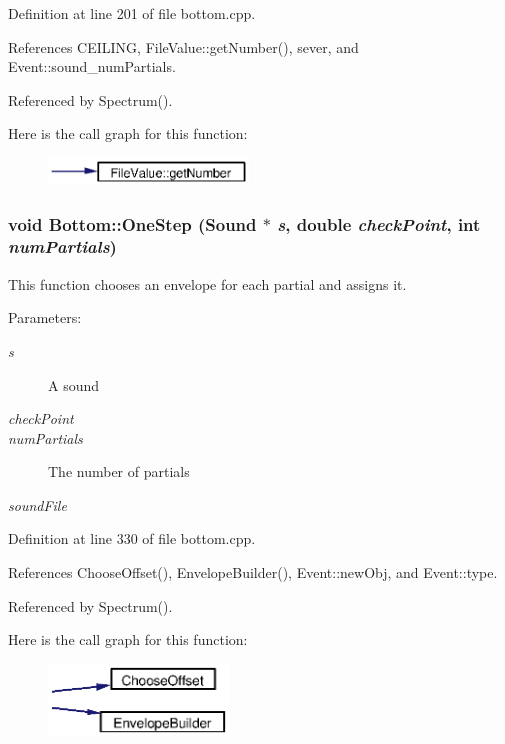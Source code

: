 Definition at line 201 of file bottom.cpp.

References CEILING, File\-Value::get\-Number(), sever, and Event::sound\_\-num\-Partials.

Referenced by Spectrum().

Here is the call graph for this function:\begin{figure}[H]
\begin{center}
\leavevmode
\includegraphics[width=151pt]{classBottom_a15_cgraph}
\end{center}
\end{figure}
\subsubsection{\setlength{\rightskip}{0pt plus 5cm}void Bottom::One\-Step (Sound $\ast$ {\em s}, double {\em check\-Point}, int {\em num\-Partials})}\label{classBottom_a19}


This function chooses an envelope for each partial and assigns it. \begin{Desc}
\item[Parameters:]
\begin{description}
\item[{\em s}]A sound \item[{\em check\-Point}]\item[{\em num\-Partials}]The number of partials \item[{\em sound\-File}]\end{description}
\end{Desc}


Definition at line 330 of file bottom.cpp.

References Choose\-Offset(), Envelope\-Builder(), Event::new\-Obj, and Event::type.

Referenced by Spectrum().

Here is the call graph for this function:\begin{figure}[H]
\begin{center}
\leavevmode
\includegraphics[width=136pt]{classBottom_a19_cgraph}
\end{center}
\end{figure}
